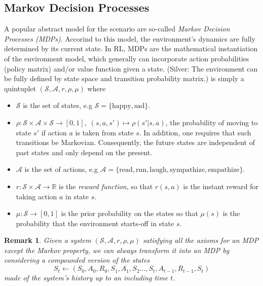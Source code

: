 \documentclass{article} %
\newtheorem{remark}{Remark}
\begin{document}
\subsection{Markov Decision Processes}
A popular abstract model for the scenario are so-called \textit{Markov Decision Processes (MDPs)}.
Accorind to this model, the environment’s dynamics are fully determined by
its current state.
In RL, MDPs are the mathematical instantiation of the environment model,
which generally can incorporate action probabilities (policy matrix)
and/or value function given a state.
(Silver: The environment can be fully defined by state space and
transition probability matrix.)
is simply a quintuplet $(\mathcal S, \mathcal A, r, \rho, \mu)$ where
\begin{itemize}
\item $\mathcal S$ is the set of states, e.g $\mathcal S = \{\text{happy}, \text{sad}\}$.
\item $\rho : \mathcal S \times \mathcal A \times \mathcal S \rightarrow [0, 1],\; (s,a,s') \mapsto \rho(s'|s,a)$,
  the probability of moving to state $s'$ if action $a$ is taken from state $s$. In addition, one requires that such
  transitions be Markovian. Consequently, the future states are independent of past states and only depend on the present.  
\item $\mathcal A$ is the set of actions, e.g $\mathcal A = \{\text{read}, \text{run},
  \text{laugh}, \text{sympathize}, \text{empathize}\}.$
\item $r : \mathcal S \times \mathcal A \rightarrow \mathbb R$ is the \textit{reward function},
  so that $r(s, a)$ is the instant reward for taking action $a$ in state $s$.
\item $\mu: \mathcal S \rightarrow [0, 1]$ is the prior probability on the states so that
  $\mu(s)$ is the probability that the environment starts-off in state $s$.
\end{itemize}

\begin{remark}
  Given a system $(\mathcal S, \mathcal A, r, \rho, \mu)$ satisfying all the axioms for an MDP
  except the Markov property, we can always transform it into an MDP by considering a compounded
  version of the states
  $$S_t \leftarrow (S_0,A_0,R_0,S_1,A_1,S_2\ldots,S_t,A_{t-1},R_{t-1},S_{t})$$ made of the system's
  history up to an including time $t$.
\end{remark}
\end{document}

